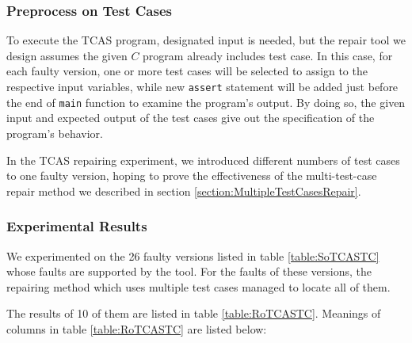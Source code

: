 \subsubsection{Preprocess on Test Cases}
To execute the TCAS program, designated input is needed, but the repair tool we design assumes the given $C$ program already includes test case.
In this case, for each faulty version, one or more test cases will be selected to assign to the respective input variables, while new \lstinline|assert| statement will be added just before the end of \lstinline|main| function
to examine the program's output.
By doing so, the given input and expected output of the test cases give out the specification of the program's behavior.

In the TCAS repairing experiment, we introduced different numbers of test cases to one faulty version, hoping to prove the effectiveness of the multi-test-case repair method we described in section \ref{section:MultipleTestCasesRepair}.

\subsubsection{Experimental Results}
We experimented on the 26 faulty versions listed in table \ref{table:SoTCASTC} whose faults are supported by the tool. For the faults of these versions, the repairing method which uses multiple test cases managed to locate all of them.

The results of 10 of them are listed in table \ref{table:RoTCASTC}. Meanings of columns in table \ref{table:RoTCASTC} are listed below:

